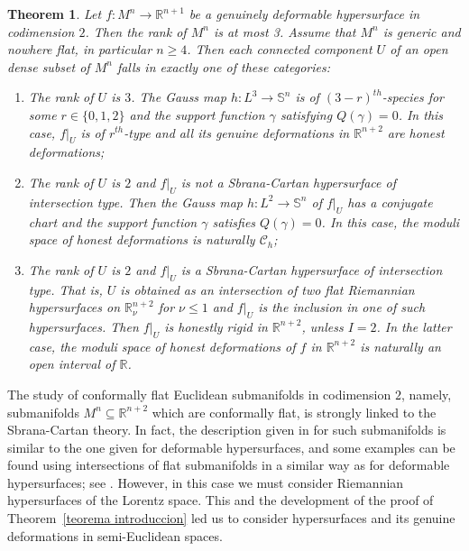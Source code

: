 \documentclass{article}
\newtheorem{thm}{Theorem}[section]
\theoremstyle{remark}
\begin{document}
\begin{thm}\label{Descripcion SC p=2 generica}
    Let $f:M^{n}\rightarrow\mathbb{R}^{n+1}$ be a genuinely deformable hypersurface in codimension $2$. Then the rank of $M^n$ is at most 3. Assume that $M^n$ is generic and nowhere flat, in particular $n\geq 4$. Then each connected component $U$ of an open dense subset of $M^n$ falls in exactly one of these categories:
    \begin{enumerate}
        \item The rank of $U$ is $3$. The Gauss map $h:L^3\rightarrow\mathbb{S}^{n}$ is of $(3-r)^{th}$-species for some $r\in\{0,1,2\}$ and the support function $\gamma$ satisfying $Q(\gamma)=0$. In this case, $f|_U$ is of $r^{th}$-type and all its genuine deformations in $\mathbb{R}^{n+2}$ are honest deformations;
        \item The rank of $U$ is $2$ and $f|_U$ is not a Sbrana-Cartan hypersurface of intersection type. Then the Gauss map $h:L^2\rightarrow\mathbb{S}^{n}$ of $f|_U$ has a conjugate chart and the support function $\gamma$ satisfies $Q(\gamma)=0$. In this case, the moduli space of honest deformations is naturally $\mathcal{C}_h$;
        \item The rank of $U$ is $2$ and $f|_U$ is a Sbrana-Cartan hypersurface of intersection type. That is, $U$ is obtained as an intersection of two flat Riemannian hypersurfaces on $\mathbb{R}^{n+2}_{\nu}$ for $\nu\leq 1$ and $f|_U$ is the inclusion in one of such hypersurfaces.
        Then $f|_U$ is honestly rigid in $\mathbb{R}^{n+2}$, unless $I=2$. In the latter case, the moduli space of honest deformations of $f$ in $\mathbb{R}^{n+2}$ is naturally an open interval of $\mathbb{R}$.
    \end{enumerate}
\end{thm}

\text{ }

The study of conformally flat Euclidean submanifolds in codimension $2$, namely, submanifolds $M^n\subseteq\mathbb{R}^{n+2}$ which are conformally flat, is strongly linked to the Sbrana-Cartan theory. In fact, the description given in \cite{DF2} for such submanifolds is similar to the one given for deformable hypersurfaces, and some examples can be found using intersections of flat submanifolds in a similar way as for deformable hypersurfaces; see \cite{DF6}. However, in this case we must consider Riemannian hypersurfaces of the Lorentz space. This and the development of the proof of Theorem~\ref{teorema introduccion} led us to consider hypersurfaces and its genuine deformations in semi-Euclidean spaces.
\end{document}
